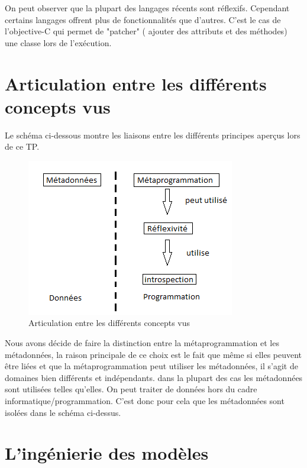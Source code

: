 \documentclass[a4paper,11pt]{report}
\begin{document}
{{\normalsize{
On peut observer que la plupart des langages récents sont réflexifs. Cependant certains langages offrent plus de fonctionnalités que d'autres. C'est le cas de l'objective-C qui permet de "patcher" ( ajouter des attributs et des méthodes) une classe lors de l'exécution.
}

\section{Articulation entre les différents concepts vus}

\normalsize{
Le schéma ci-dessous montre les liaisons entre les différents principes aperçus lors de ce TP. 
}

\clearpage

\begin{figure}[h]
   \begin{center}
   \includegraphics[scale = 0.8]{articulation.png}
   \end{center}
  \caption{Articulation entre les différents concepts vus}
\end{figure}

\normalsize{
Nous avons décide de faire la distinction entre la métaprogrammation et les métadonnées, la raison principale de ce choix est le fait que même si elles peuvent être liées et que la métaprogrammation peut utiliser les métadonnées, il s'agit de domaines bien différents et indépendants. dans la plupart des cas les métadonnées sont utilisées telles qu'elles. On peut traiter de données hors du cadre informatique/programmation. C'est donc pour cela que les métadonnées sont isolées dans le schéma ci-dessus. 
}

\section{L'ingénierie des modèles}

}}
\end{document}
